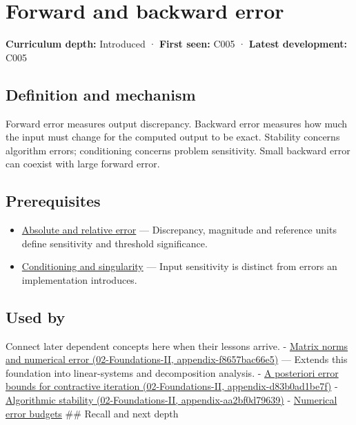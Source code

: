 \hypertarget{appendix-a7fbaf6d1b1c}{}
\section{Forward and backward error}\label{appendix-a7fbaf6d1b1c-forward-and-backward-error}

\textbf{Curriculum depth:} Introduced · \textbf{First seen:} C005 · \textbf{Latest development:} C005

\subsection{Definition and mechanism}\label{appendix-a7fbaf6d1b1c-definition-and-mechanism}

Forward error measures output discrepancy. Backward error measures how much the input must change for the computed output to be exact. Stability concerns algorithm errors; conditioning concerns problem sensitivity. Small backward error can coexist with large forward error.

\subsection{Prerequisites}\label{appendix-a7fbaf6d1b1c-prerequisites}

\begin{itemize}
\tightlist
\item
  \hyperref[appendix-3ae74e89b4e6]{Absolute and relative error} --- Discrepancy, magnitude and reference units define sensitivity and threshold significance.
\item
  \hyperref[appendix-8f6a01f284a7]{Conditioning and singularity} --- Input sensitivity is distinct from errors an implementation introduces.
\end{itemize}

\subsection{Used by}\label{appendix-a7fbaf6d1b1c-used-by}

Connect later dependent concepts here when their lessons arrive. - \href{../02-Foundations-II/main.pdf\#nameddest=appendix-f8657bac66e5}{Matrix norms and numerical error (02-Foundations-II, appendix-f8657bac66e5)} --- Extends this foundation into linear-systems and decomposition analysis. - \href{../02-Foundations-II/main.pdf\#nameddest=appendix-d83b0ad1be7f}{A posteriori error bounds for contractive iteration (02-Foundations-II, appendix-d83b0ad1be7f)} - \href{../02-Foundations-II/main.pdf\#nameddest=appendix-aa2bf0d79639}{Algorithmic stability (02-Foundations-II, appendix-aa2bf0d79639)} - \hyperref[appendix-31b8c295e05f]{Numerical error budgets} \#\# Recall and next depth

